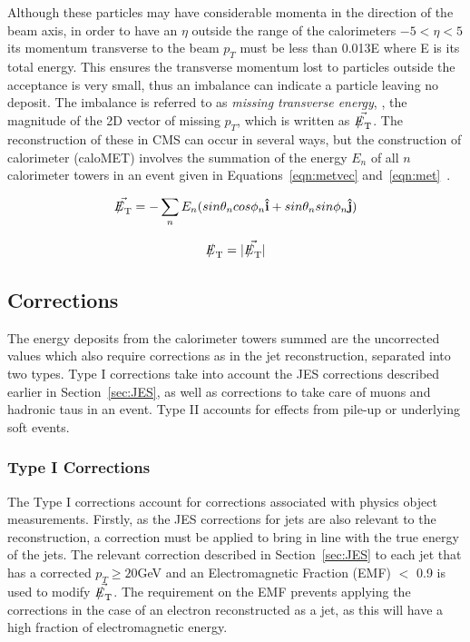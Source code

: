 Although these particles may have considerable momenta in the direction of the beam axis, in order to have an $\eta$ outside the range of the calorimeters $ -5 < \eta < 5$ its momentum transverse to the beam $p_{T}$ must be less than 0.013E where E is its total energy. This ensures the transverse momentum lost to particles outside the acceptance is very small, thus an imbalance can indicate a particle leaving no deposit. The imbalance is referred to as \textit{missing transverse energy}, \met, the magnitude of the 2D vector of missing $p_{T}$, which is written as $\vec{\met}$. The reconstruction of these in CMS can occur in several ways, but the construction of calorimeter \met  (caloMET) involves the summation of the energy $E_{n}$ of all $n$ calorimeter towers in an event given in Equations~\ref{eqn:metvec} and~\ref{eqn:met}~\cite{metrecon}. 

\begin{equation}
\vec{\met} = - \sum_{n} E_{n} (sin \theta_{n} cos \phi_{n} \mathbf{\hat{i}} + sin \theta_{n} sin \phi_{n}  \mathbf{\hat{j}})
\label{eqn:metvec}
\end{equation}

\begin{equation}
\met = | \vec{\met} | 
\label{eqn:met}
\end{equation}

\subsection{\met Corrections}

The energy deposits from the calorimeter towers summed are the uncorrected values which also require corrections as in the jet reconstruction, separated into two types. Type I corrections take into account the JES  corrections described earlier in Section~\ref{sec:JES}, as well as corrections to take care of muons and hadronic taus in an event. Type II  accounts for effects from pile-up or underlying soft events.
 
\subsubsection{Type I Corrections}
The Type I corrections account for corrections associated with physics object measurements. Firstly, as the JES corrections for jets are also relevant to the \met reconstruction, a correction must be applied to bring \met in line with the true energy of the jets. The relevant correction described in Section~\ref{sec:JES} to each jet that has a corrected $p_{T} \geq 20 $GeV and an Electromagnetic Fraction (EMF) $<$ 0.9 is used to modify $\vec{\met}$. The requirement on the EMF prevents applying the corrections in the case of an electron reconstructed as a jet, as this will have a high fraction of electromagnetic  energy.

